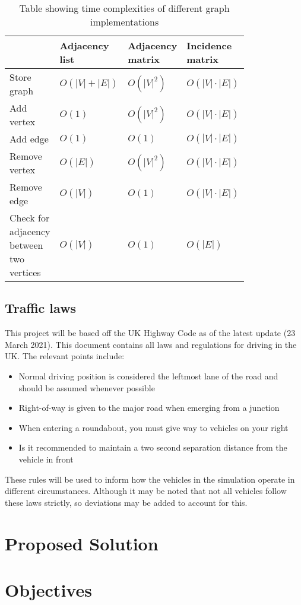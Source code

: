         \begin{table}
            \begin{tabular}{|p{0.2\linewidth}|p{0.2\linewidth}|p{0.2\linewidth}|p{0.2\linewidth}|} \hline
            & Adjacency list & Adjacency matrix & Incidence matrix \\ \hline
            Store graph   & $O(|V|+|E|)$ & $O(|V|^2)$ & $O(|V|\cdot|E|)$ \\ \hline
            Add vertex    & $O(1)$ & $O(|V|^2)$ & $O(|V|\cdot|E|)$ \\ \hline
            Add edge      & $O(1)$ & $O(1)$ & $O(|V|\cdot|E|)$ \\ \hline
            Remove vertex & $O(|E|)$ & $O(|V|^2)$ & $O(|V|\cdot|E|)$ \\ \hline
            Remove edge   & $O(|V|)$ & $O(1)$ & $O(|V|\cdot|E|)$ \\ \hline
            Check for adjacency between two vertices & $O(|V|)$ & $O(1)$ & $O(|E|)$ \\ \hline
            \end{tabular}
            \caption{Table showing time complexities of different graph implementations}
            \label{graph-time-complexities}
        \end{table}



    \subsection{Traffic laws}

        This project will be based off the UK Highway Code \cite{Highway-Code} as of the latest update (23 March 2021). This document contains all laws and regulations for driving in the UK. The relevant points include:

        \begin{itemize}
            \item Normal driving position is considered the leftmost lane of the road and should be assumed whenever possible
            \item Right-of-way is given to the major road when emerging from a junction
            \item When entering a roundabout, you must give way to vehicles on your right
            \item Is it recommended to maintain a two second separation distance from the vehicle in front
        \end{itemize}

        These rules will be used to inform how the vehicles in the simulation operate in different circumstances. Although it may be noted that not all vehicles follow these laws strictly, so deviations may be added to account for this.

\section{Proposed Solution}

\section{Objectives}

